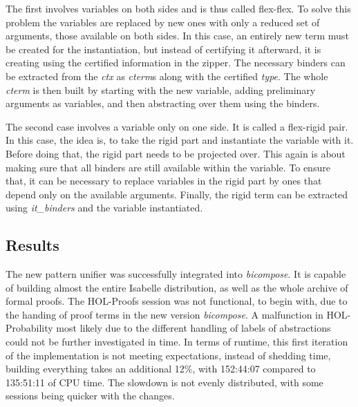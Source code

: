 \documentclass[12pt,a4paper]{article}
\newcommand{\type}[1]{\textit{#1}}
\newcommand{\recordentry}[1]{\textit{#1}}
\newcommand{\function}[1]{\textit{#1}}
\begin{document}
The first involves variables on both sides and is thus called flex-flex.
To solve this problem the variables are replaced by new ones with only a reduced set of arguments, those available on both sides.
In this case, an entirely new term must be created for the instantiation, but instead of certifying it afterward, it is creating using the certified information in the zipper.
The necessary binders can be extracted from the \recordentry{ctx} as \type{cterm}s along with the certified \type{type}.
The whole \type{cterm} is then built by starting with the new variable, adding preliminary arguments as variables, and then abstracting over them using the binders.

The second case involves a variable only on one side.
It is called a flex-rigid pair.
In this case, the idea is, to take the rigid part and instantiate the variable with it.
Before doing that, the rigid part needs to be projected over.
This again is about making sure that all binders are still available within the variable.
To ensure that, it can be necessary to replace variables in the rigid part by ones that depend only on the available arguments.
Finally, the rigid term can be extracted using \function{it\_binders} and the variable instantiated.

\subsection*{Results}

The new pattern unifier was successfully integrated into \function{bicompose}.
It is capable of building almost the entire Isabelle distribution, as well as the whole archive of formal proofs.
The HOL-Proofs session was not functional, to begin with, due to the handing of proof terms in the new version \function{bicompose}.
A malfunction in HOL-Probability most likely due to the different handling of labels of abstractions could not be further investigated in time.
In terms of runtime, this first iteration of the implementation is not meeting expectations, instead of shedding time, building everything takes an additional 12\%, with 152:44:07 compared to 135:51:11 of CPU time. The slowdown is not evenly distributed, with some sessions being quicker with the changes.



\end{document}
